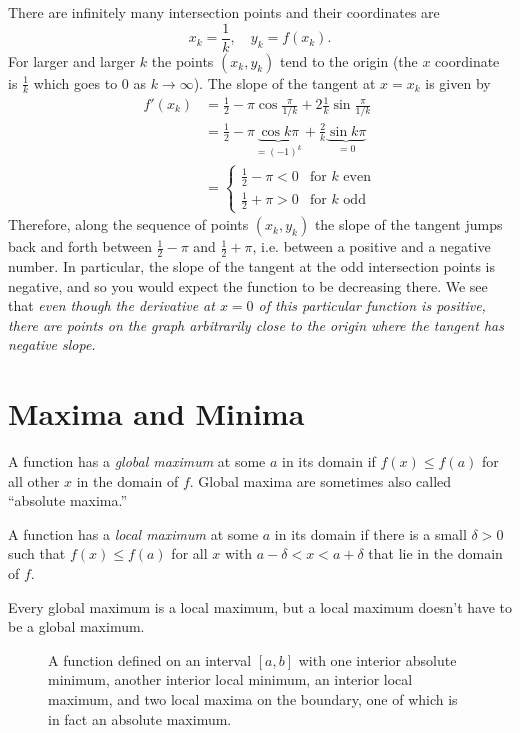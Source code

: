 There are infinitely many intersection points and their coordinates are
\[
x_k= \frac1k,\quad y_k= f(x_k).
\]
For larger and larger $k$ the points $(x_k, y_k)$ tend to the origin (the $x$
coordinate is $\frac1k$ which goes to 0 as $k\to\infty$).  The slope of the
tangent at $x=x_k$ is given by
\begin{align*}
  f'(x_k) &= \frac12-\pi\cos\frac\pi{1/k} +2\frac1k\sin\frac\pi{1/k}\\
  &= \frac12-\pi \underbrace{\cos k\pi}_{=(-1)^k} +\frac2k
  \underbrace{\sin k\pi}_{=0}\\
  &=\begin{cases}
    \frac12-\pi<0 & \text{for $k$ even}\\[4pt]
    \frac12+\pi>0 & \text{for $k$ odd}
  \end{cases}
\end{align*}
Therefore, along the sequence of points $(x_k, y_k)$ the slope of the tangent
jumps back and forth between $\frac12-\pi$ and $\frac12+\pi$, i.e. between a
positive and a negative number.
In particular, the slope of the tangent at the odd intersection points is
negative, and so you would expect the function to be decreasing there.  
We see that \textit{even though the derivative at $x=0$ of this
particular function is positive, there are points on the graph arbitrarily close
to the origin where the tangent has negative slope.}


\section{Maxima and Minima}
A function has a \emph{global maximum} at some $a$ in its domain if $f(x)\leq
f(a)$ for all other $x$ in the domain of $f$.  Global maxima are sometimes also
called ``absolute maxima.''

A function has a \emph{local maximum} at some $a$ in its domain if
there is a small $\delta>0$ such that $f(x)\leq f(a)$ for all $x$ with
$a-\delta<x<a+\delta$ that lie in the domain of $f$.

Every global maximum is a local maximum, but a local maximum doesn't have to be
a global maximum.
\begin{figure}[h]
  \centering{ }
  \caption{A function defined on an interval $[a, b]$ with one interior absolute
    minimum, another interior local minimum, an interior local maximum, and two
    local maxima on the boundary, one of which is in fact an absolute maximum.}
  \label{fig:05maxAndMins}
\end{figure}

